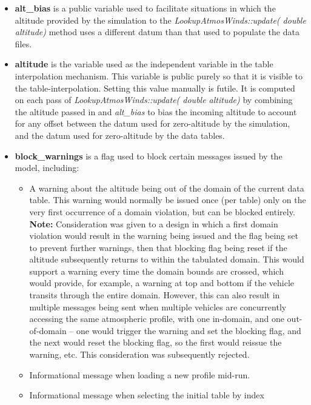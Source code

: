\documentclass[11pt,fleqn]{report}
\begin{document}
\begin{itemize}
\item \textbf{alt\_bias} is a public variable used to facilitate situations
  in which the altitude provided by the simulation to the
  \textit{LookupAtmosWinds::update( double altitude)} method
  uses a different datum than that used to populate the data files.
\item \textbf{altitude} is the variable used as the independent variable in
  the table interpolation mechanism. This variable is public purely so that it
  is visible to the table-interpolation. Setting this value manually is
  futile. It is computed on each pass of
  \textit{LookupAtmosWinds::update( double altitude)} by combining the altitude
  passed in and
  \textit{alt\_bias} to bias the incoming altitude to account for any offset
  between the datum used for zero-altitude by the simulation, and
  the datum used for zero-altitude by the data tables.
\item \textbf{block\_warnings} is a flag used to block certain messages
  issued by the model, including:
  \begin{itemize}
  \item A warning about the altitude being out of the domain of the current
    data table. This warning would normally be issued once (per table) only
    on the very first occurrence of a domain violation, but can be blocked
    entirely.\\
    \textbf{Note:} Consideration was given to a design in which a first
    domain violation would result in the warning being issued and the flag
    being set to prevent further warnings, then that blocking flag being
    reset if the altitude subsequently returns to within the tabulated domain.
    This would support a warning every time the domain bounds are crossed,
    which would provide, for example, a warning at top and bottom if the
    vehicle transits through the entire domain.
    However, this can also result in
    multiple messages being sent when multiple vehicles are concurrently
    accessing the same atmospheric profile, with one in-domain, and one
    out-of-domain -- one would trigger the warning and set the blocking
    flag, and the next would reset the blocking flag, so the first would
    reissue the warning, etc.
    This consideration was subsequently rejected.
  \item Informational message when loading a new profile mid-run.
  \item Informational message when selecting the initial table by index

\end{itemize}
\end{itemize}
\end{document}
